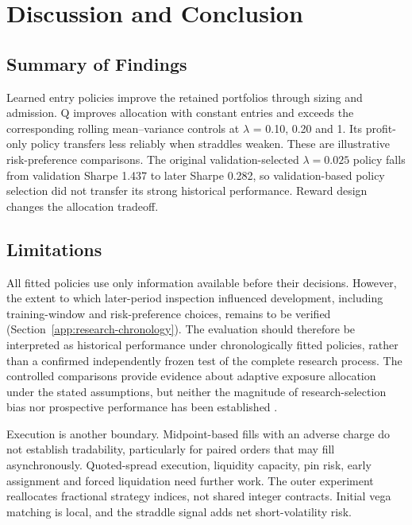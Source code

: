 \section{Discussion and Conclusion}\label{sec:20}

\subsection*{Summary of Findings}

Learned entry policies improve the retained portfolios through sizing and admission. Q improves allocation with constant entries and exceeds the corresponding rolling mean--variance controls at \(\lambda\) = 0.10, 0.20 and 1. Its profit-only policy transfers less reliably when straddles weaken. These are illustrative risk-preference comparisons. The original validation-selected \(\lambda=0.025\) policy falls from validation Sharpe 1.437 to later Sharpe 0.282, so validation-based policy selection did not transfer its strong historical performance. Reward design changes the allocation tradeoff.


\subsection*{Limitations}

All fitted policies use only information available before their decisions. However, the extent to which later-period inspection influenced development, including training-window and risk-preference choices, remains to be verified (Section~\ref{app:research-chronology}). The evaluation should therefore be interpreted as historical performance under chronologically fitted policies, rather than a confirmed independently frozen test of the complete research process. The controlled comparisons provide evidence about adaptive exposure allocation under the stated assumptions, but neither the magnitude of research-selection bias nor prospective performance has been established \cite{bailey2014deflated}.


Execution is another boundary. Midpoint-based fills with an adverse charge do not establish tradability, particularly for paired orders that may fill asynchronously. Quoted-spread execution, liquidity capacity, pin risk, early assignment and forced liquidation need further work. The outer experiment reallocates fractional strategy indices, not shared integer contracts. Initial vega matching is local, and the straddle signal adds net short-volatility risk.


